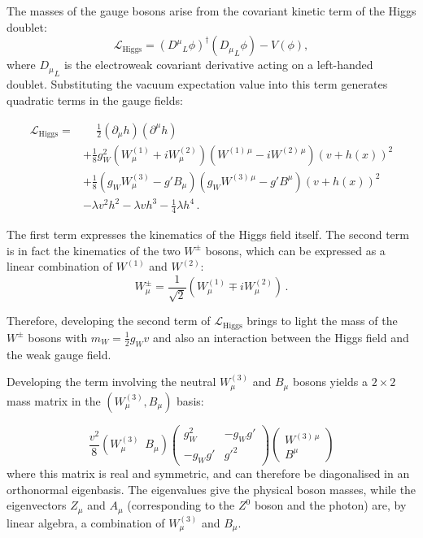 \vspace{0.5 cm}

The masses of the gauge bosons arise from the covariant kinetic term of the Higgs doublet:
\begin{equation}
    \mathcal{L}_{\mathrm{Higgs}} = ({D^\mu}_L \phi)^\dagger ({D_\mu}_L \phi) - V(\phi),
\end{equation}
where ${D_\mu}_L$ is the electroweak covariant derivative acting on a left-handed doublet. Substituting the vacuum expectation value into this term generates quadratic terms in the gauge fields:

\begin{equation}
    \begin{split}
    \mathcal{L}_{\mathrm{Higgs}} =& \quad \, \frac{1}{2} (\partial_\mu h) (\partial^\mu h) \\
    &+ \frac{1}{8} g_W^2 \left( W_\mu^{(1)}+iW_\mu^{(2)} \right) \left( W^{(1) \,\mu}-iW^{(2) \,\mu} \right) \left(v+h(x)\right)^2 \\
    &+ \frac{1}{8} \left( g_W W_\mu^{(3)}-g'B_\mu \right) \left( g_W W^{(3) \,\mu}-g'B^\mu \right) \left(v+h(x)\right)^2 \\
    &- \lambda v^2 h^2 - \lambda v h^3 -\frac{1}{4}\lambda h^4 \, .
    \end{split}
\end{equation}

The first term expresses the kinematics of the Higgs field itself. The second term is in fact the kinematics of the two $W^\pm$ bosons, which can be expressed as a linear combination of $W^{(1)}$ and $W^{(2)}$:
\begin{equation}
    W^\pm_\mu = \frac{1}{\sqrt{2}}\left( W^{(1)}_\mu \mp i W^{(2)}_\mu \right)\,.
\end{equation}

Therefore, developing the second term of $\mathcal{L}_{\mathrm{Higgs}}$ brings to light the mass of the $W^\pm$ bosons with $m_W=\frac{1}{2}g_Wv$ and also an interaction between the Higgs field and the weak gauge field.

Developing the term involving the neutral $W_\mu^{(3)}$ and $B_\mu$ bosons yields a $2\times 2$ mass matrix in the $(W^{(3)}_\mu, B_\mu)$ basis:

\begin{equation}
    \frac{v^2}{8}\left(W^{(3)}_\mu \,\,\, B_\mu\right) 
    \begin{pmatrix} g_W^2 & -g_Wg' \\ -g_Wg' & g'^2 \end{pmatrix}
    \left( \begin{array}{c} W^{(3) \,\mu} \\ B^\mu \end{array} \right)
    \label{eq:massZandA}
\end{equation}
where this matrix is real and symmetric, and can therefore be diagonalised in an orthonormal eigenbasis. The eigenvalues give the physical boson masses, while the eigenvectors $Z_\mu$ and $A_\mu$ (corresponding to the $Z^0$ boson and the photon) are, by linear algebra, a combination of $W_\mu^{(3)}$ and $B_\mu$. 

